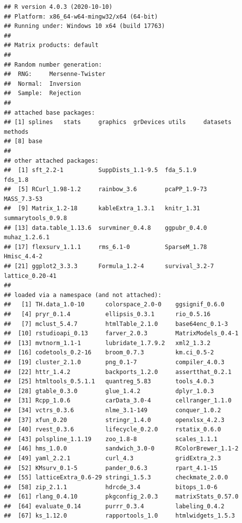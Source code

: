 \documentclass[
]{article}
\begin{document}
\begin{verbatim}
## R version 4.0.3 (2020-10-10)
## Platform: x86_64-w64-mingw32/x64 (64-bit)
## Running under: Windows 10 x64 (build 17763)
## 
## Matrix products: default
## 
## Random number generation:
##  RNG:     Mersenne-Twister 
##  Normal:  Inversion 
##  Sample:  Rejection 
##  
## attached base packages:
## [1] splines   stats     graphics  grDevices utils     datasets  methods  
## [8] base     
## 
## other attached packages:
##  [1] sft_2.2-1          SuppDists_1.1-9.5  fda_5.1.9          fds_1.8           
##  [5] RCurl_1.98-1.2     rainbow_3.6        pcaPP_1.9-73       MASS_7.3-53       
##  [9] Matrix_1.2-18      kableExtra_1.3.1   knitr_1.31         summarytools_0.9.8
## [13] data.table_1.13.6  survminer_0.4.8    ggpubr_0.4.0       muhaz_1.2.6.1     
## [17] flexsurv_1.1.1     rms_6.1-0          SparseM_1.78       Hmisc_4.4-2       
## [21] ggplot2_3.3.3      Formula_1.2-4      survival_3.2-7     lattice_0.20-41   
## 
## loaded via a namespace (and not attached):
##   [1] TH.data_1.0-10      colorspace_2.0-0    ggsignif_0.6.0     
##   [4] pryr_0.1.4          ellipsis_0.3.1      rio_0.5.16         
##   [7] mclust_5.4.7        htmlTable_2.1.0     base64enc_0.1-3    
##  [10] rstudioapi_0.13     farver_2.0.3        MatrixModels_0.4-1 
##  [13] mvtnorm_1.1-1       lubridate_1.7.9.2   xml2_1.3.2         
##  [16] codetools_0.2-16    broom_0.7.3         km.ci_0.5-2        
##  [19] cluster_2.1.0       png_0.1-7           compiler_4.0.3     
##  [22] httr_1.4.2          backports_1.2.0     assertthat_0.2.1   
##  [25] htmltools_0.5.1.1   quantreg_5.83       tools_4.0.3        
##  [28] gtable_0.3.0        glue_1.4.2          dplyr_1.0.3        
##  [31] Rcpp_1.0.6          carData_3.0-4       cellranger_1.1.0   
##  [34] vctrs_0.3.6         nlme_3.1-149        conquer_1.0.2      
##  [37] xfun_0.20           stringr_1.4.0       openxlsx_4.2.3     
##  [40] rvest_0.3.6         lifecycle_0.2.0     rstatix_0.6.0      
##  [43] polspline_1.1.19    zoo_1.8-8           scales_1.1.1       
##  [46] hms_1.0.0           sandwich_3.0-0      RColorBrewer_1.1-2 
##  [49] yaml_2.2.1          curl_4.3            gridExtra_2.3      
##  [52] KMsurv_0.1-5        pander_0.6.3        rpart_4.1-15       
##  [55] latticeExtra_0.6-29 stringi_1.5.3       checkmate_2.0.0    
##  [58] zip_2.1.1           hdrcde_3.4          bitops_1.0-6       
##  [61] rlang_0.4.10        pkgconfig_2.0.3     matrixStats_0.57.0 
##  [64] evaluate_0.14       purrr_0.3.4         labeling_0.4.2     
##  [67] ks_1.12.0           rapportools_1.0     htmlwidgets_1.5.3  

\end{verbatim}
\end{document}
